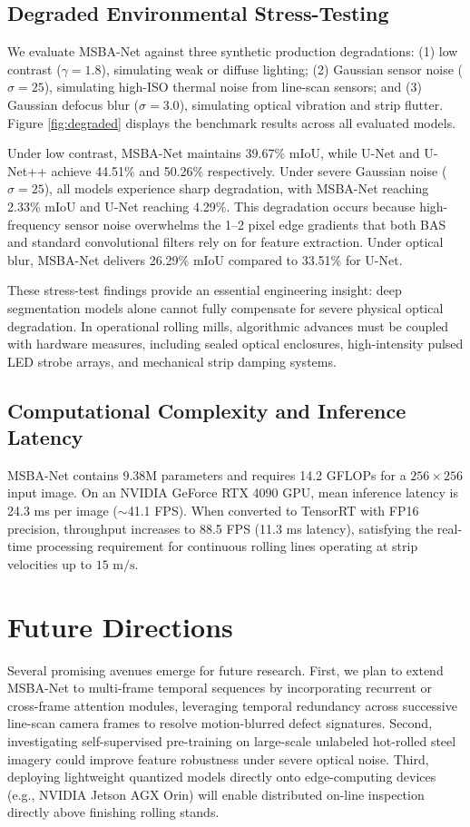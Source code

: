 \documentclass[10pt,a4paper]{article}
\begin{document}
\subsection{Degraded Environmental Stress-Testing}
We evaluate MSBA-Net against three synthetic production degradations: (1) low contrast ($\gamma = 1.8$), simulating weak or diffuse lighting; (2) Gaussian sensor noise ($\sigma = 25$), simulating high-ISO thermal noise from line-scan sensors; and (3) Gaussian defocus blur ($\sigma = 3.0$), simulating optical vibration and strip flutter. Figure \ref{fig:degraded} displays the benchmark results across all evaluated models.

Under low contrast, MSBA-Net maintains 39.67\% mIoU, while U-Net and U-Net++ achieve 44.51\% and 50.26\% respectively. Under severe Gaussian noise ($\sigma = 25$), all models experience sharp degradation, with MSBA-Net reaching 2.33\% mIoU and U-Net reaching 4.29\%. This degradation occurs because high-frequency sensor noise overwhelms the 1--2 pixel edge gradients that both BAS and standard convolutional filters rely on for feature extraction. Under optical blur, MSBA-Net delivers 26.29\% mIoU compared to 33.51\% for U-Net.

These stress-test findings provide an essential engineering insight: deep segmentation models alone cannot fully compensate for severe physical optical degradation. In operational rolling mills, algorithmic advances must be coupled with hardware measures, including sealed optical enclosures, high-intensity pulsed LED strobe arrays, and mechanical strip damping systems.

\subsection{Computational Complexity and Inference Latency}
MSBA-Net contains 9.38M parameters and requires 14.2 GFLOPs for a $256 \times 256$ input image. On an NVIDIA GeForce RTX 4090 GPU, mean inference latency is 24.3 ms per image ($\sim$41.1 FPS). When converted to TensorRT with FP16 precision, throughput increases to 88.5 FPS (11.3 ms latency), satisfying the real-time processing requirement for continuous rolling lines operating at strip velocities up to $15\text{ m/s}$.

\section{Future Directions}
Several promising avenues emerge for future research. First, we plan to extend MSBA-Net to multi-frame temporal sequences by incorporating recurrent or cross-frame attention modules, leveraging temporal redundancy across successive line-scan camera frames to resolve motion-blurred defect signatures. Second, investigating self-supervised pre-training on large-scale unlabeled hot-rolled steel imagery could improve feature robustness under severe optical noise. Third, deploying lightweight quantized models directly onto edge-computing devices (e.g., NVIDIA Jetson AGX Orin) will enable distributed on-line inspection directly above finishing rolling stands.
\end{document}
